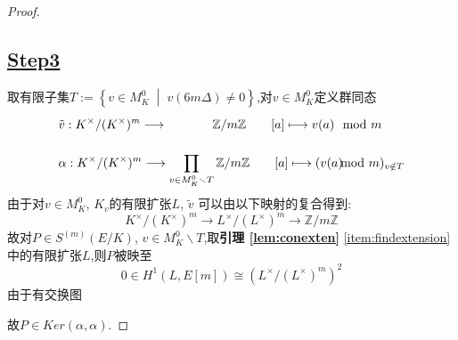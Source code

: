 \documentclass[12pt,A4paper,oneside,reqno]{amsart}
\numberwithin{equation}{section}
\theoremstyle{definition}
\theoremstyle{plain}
\theoremstyle{plain}
\numberwithin{equation}{section}
\theoremstyle{remark}
\begin{document}
\begin{proof}
\subsection*{\underline{Step3}}
取有限子集$T:=\left\{ v \in M_K^0\;\middle|\; v(6m\Delta)\neq 0 \right\} $,对$v \in M_K^0$定义群同态
\begin{equation*}
\begin{aligned}
	&\tilde{v}:K^{\times}/(K^{\times})^m \longrightarrow \phantom{\prod_{v\in M_K^0 \smallsetminus T}} \mathbb{Z}/m\mathbb{Z} \qquad [a] \longmapsto v(a) \mod m\\
	&\alpha:K^{\times}/(K^{\times})^m \longrightarrow  \prod_{v\in M_K^0 \smallsetminus T} \mathbb{Z}/m\mathbb{Z} \qquad [a] \longmapsto (v(a) \hspace{-0.3cm}\mod m)_{v \notin T}\\
\end{aligned}
\end{equation*}
由于对$v \in M_K^0$, $K_v$的有限扩张$L$, $\tilde{v}$ 可以由以下映射的复合得到:
$$K^{\times}/(K^{\times})^m \longrightarrow L^{\times}/(L^{\times})^m \longrightarrow \mathbb{Z}/m\mathbb{Z}$$
故对$P \in S^{(m)}(E/K)$, $v \in M_K^0 \smallsetminus T$,取\textbf{引理 \ref{lem:conexten}} \ref{item:findextension}中的有限扩张$L$,则$P$被映至
$$0 \in H^1(L,E[m]) \cong (L^{\times}/(L^{\times})^m)^2$$
由于有交换图
\begin{center}
\end{center}
故$P \in Ker (\alpha, \alpha)$.

\end{proof}
\end{document}

